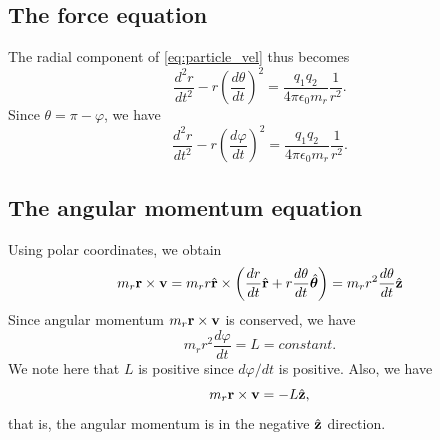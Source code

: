 \documentclass[a4paper,11pt]{report}
\begin{document}
\subsection{The force equation}
The radial component of \cref{eq:particle_vel} thus becomes 
\begin{equation}
    \frac{d^2 r}{dt^2} - r \left ( \frac{d\theta}{dt} \right )^2 = \frac{q_1 q_2}{4 \pi \epsilon_0 m_r} \frac{1}{r^2}.
\end{equation}
Since $\theta = \pi - \varphi$, we have
\begin{equation}
    \label{eq:particle_position_ode}
    \frac{d^2 r}{dt^2} - r \left ( \frac{d\varphi}{dt} \right )^2 = \frac{q_1 q_2}{4 \pi \epsilon_0 m_r} \frac{1}{r^2}.
\end{equation}

\subsection{The angular momentum equation}
Using polar coordinates, we obtain
\begin{equation}
    m_r \mathbf{r} \times \mathbf{v} = m_r r \hat{\mathbf{r}} \times \left ( \frac{dr}{dt} \hat{\mathbf{r}} + r \frac{d\theta}{dt} \hat{\bm{\theta}} \right ) = m_r r^2 \frac{d\theta}{dt} \hat{\mathbf{z}}
\end{equation}
Since angular momentum $m_r \mathbf{r} \times \mathbf{v}$ is conserved, we have
\begin{equation}
    \label{eq:particle_cons_angular_polar}
    m_r r^2 \frac{d\varphi}{dt} = L = constant.
\end{equation}
We note here that $L$ is positive since $d\varphi/dt$ is positive. Also, we have 
\begin{equation}
    \label{eq:particle_angular_sign}
    m_r \mathbf{r} \times \mathbf{v} = -L \hat{\mathbf{z}},
\end{equation}
that is, the angular momentum is in the negative $\hat{\mathbf{z}}$ direction.

\end{document}
